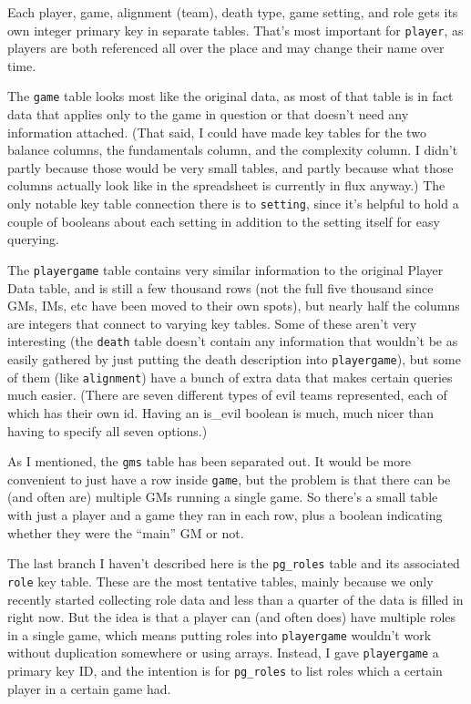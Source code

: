 \documentclass[11pt, oneside]{amsart}   	%
\begin{document}
Each player, game, alignment (team), death type, game setting, and role gets its own integer primary key in separate tables. That's most important for \texttt{player}, as players are both referenced all over the place and may change their name over time. 

The \texttt{game} table looks most like the original data, as most of that table is in fact data that applies only to the game in question or that doesn't need any information attached. (That said, I could have made key tables for the two balance columns, the fundamentals column, and the complexity column. I didn't partly because those would be very small tables, and partly because what those columns actually look like in the spreadsheet is currently in flux anyway.) The only notable key table connection there is to \texttt{setting}, since it's helpful to hold a couple of booleans about each setting in addition to the setting itself for easy querying.

The \texttt{playergame} table contains very similar information to the original Player Data table, and is still a few thousand rows (not the full five thousand since GMs, IMs, etc have been moved to their own spots), but nearly half the columns are integers that connect to varying key tables. Some of these aren't very interesting (the \texttt{death} table doesn't contain any information that wouldn't be as easily gathered by just putting the death description into \texttt{playergame}), but some of them (like \texttt{alignment}) have a bunch of extra data that makes certain queries much easier. (There are seven different types of evil teams represented, each of which has their own id. Having an is\_evil boolean is much, much nicer than having to specify all seven options.)

As I mentioned, the \texttt{gms} table has been separated out. It would be more convenient to just have a row inside \texttt{game}, but the problem is that there can be (and often are) multiple GMs running a single game. So there's a small table with just a player and a game they ran in each row, plus a boolean indicating whether they were the ``main'' GM or not. 

The last branch I haven't described here is the \texttt{pg\_roles} table and its associated \texttt{role} key table. These are the most tentative tables, mainly because we only recently started collecting role data and less than a quarter of the data is filled in right now. But the idea is that a player can (and often does) have multiple roles in a single game, which means putting roles into \texttt{playergame} wouldn't work without duplication somewhere or using arrays. Instead, I gave \texttt{playergame} a primary key ID, and the intention is for \texttt{pg\_roles} to list roles which a certain player in a certain game had. 
\end{document}
